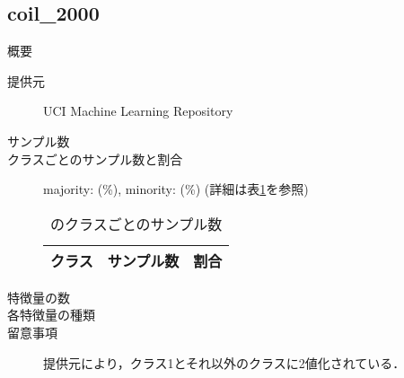 \subsection{coil\_2000}
\begin{description}
    \item[概要] \cite{}
    \item[提供元] UCI Machine Learning Repository
    \item[サンプル数] 
    \item[クラスごとのサンプル数と割合] majority:  (\%), minority:  (\%) (詳細は表\ref{tab:}を参照)

        \begin{table}[htbp]
            \centering
            \caption{のクラスごとのサンプル数}
            \label{tab:}
            \begin{tabular}{lrc} \hline
                \multicolumn{1}{c}{クラス}&
                \multicolumn{1}{c}{サンプル数}&
                \multicolumn{1}{c}{割合}\\
                \hline
                \hline

                \hline
            \end{tabular}
        \end{table}

    \item[特徴量の数] 
    \item[各特徴量の種類] \mbox{}
        
    \item[留意事項] 提供元により，クラス1とそれ以外のクラスに2値化されている．
\end{description}

